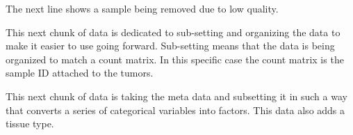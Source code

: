 \documentclass[
]{article}
\newenvironment{Shaded}{\begin{snugshade}}{\end{snugshade}}
\newcommand{\FunctionTok}[1]{\textcolor[rgb]{0.00,0.00,0.00}{#1}}
\newcommand{\NormalTok}[1]{#1}
\newcommand{\OtherTok}[1]{\textcolor[rgb]{0.56,0.35,0.01}{#1}}
\newcommand{\SpecialCharTok}[1]{\textcolor[rgb]{0.00,0.00,0.00}{#1}}
\newcommand{\StringTok}[1]{\textcolor[rgb]{0.31,0.60,0.02}{#1}}
\begin{document}
The next line shows a sample being removed due to low quality.

\begin{Shaded}
\end{Shaded}

This next chunk of data is dedicated to sub-setting and organizing the
data to make it easier to use going forward. Sub-setting means that the
data is being organized to match a count matrix. In this specific case
the count matrix is the sample ID attached to the tumors.

\begin{Shaded}
\end{Shaded}

This next chunk of data is taking the meta data and subsetting it in
such a way that converts a series of categorical variables into factors.
This data also adds a tissue type.
\end{document}
